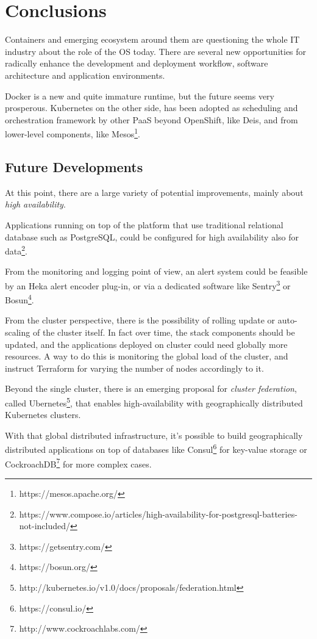 \chapter{Conclusions}\label{conclusions}

Containers and emerging ecosystem around them are questioning the whole
IT industry about the role of the OS today. There are several new
opportunities for radically enhance the development and deployment
workflow, software architecture and application environments.

Docker is a new and quite immature runtime, but the future seems very prosperous. Kubernetes on the other side, has been adopted as scheduling and orchestration
framework by other PaaS beyond OpenShift, like Deis,
and from lower-level components, like Mesos\footnote{https://mesos.apache.org/}.

\section{Future Developments}\label{future-developments}

At this point, there are a large variety of potential improvements, mainly about \textit{high availability}\cite{HighAvailability}.

Applications running on top of the platform that use traditional
relational database such as PostgreSQL, could be configured for high
availability also for data\footnote{https://www.compose.io/articles/high-availability-for-postgresql-batteries-not-included/}.

From the monitoring and logging point of view, an
alert system could be feasible by an Heka alert encoder plug-in, or via a
dedicated software like Sentry\footnote{https://getsentry.com/} or Bosun\footnote{https://bosun.org/}.

From the cluster perspective, there is the possibility of rolling update
or auto-scaling of the cluster itself. In fact over time,
the stack components should be updated, and the applications deployed on cluster
could need globally more resources. A way to do this is monitoring the
global load of the cluster, and instruct Terraform for varying the number
of nodes accordingly to it.

Beyond the single cluster, there is an emerging proposal for
\textit{cluster federation}, called Ubernetes\footnote{http://kubernetes.io/v1.0/docs/proposals/federation.html}, that enables
high-availability with geographically distributed Kubernetes clusters.

With that global distributed infrastructure, it's possible to build
geographically distributed applications on top of databases like
Consul\footnote{https://consul.io/} for key-value storage or CockroachDB\footnote{http://www.cockroachlabs.com/} for more complex cases.